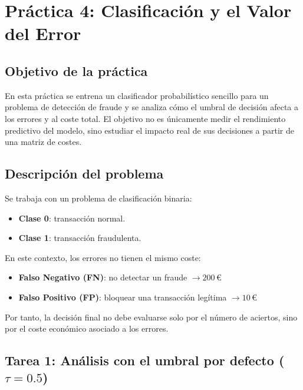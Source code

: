 
\section{Práctica 4: Clasificación y el Valor del Error}

\subsection{Objetivo de la práctica}
En esta práctica se entrena un clasificador probabilístico sencillo para un problema de detección de fraude y se analiza cómo el umbral de decisión afecta a los errores y al coste total. El objetivo no es únicamente medir el rendimiento predictivo del modelo, sino estudiar el impacto real de sus decisiones a partir de una matriz de costes.

\subsection{Descripción del problema}
Se trabaja con un problema de clasificación binaria:
\begin{itemize}
    \item \textbf{Clase 0}: transacción normal.
    \item \textbf{Clase 1}: transacción fraudulenta.
\end{itemize}

En este contexto, los errores no tienen el mismo coste:
\begin{itemize}
    \item \textbf{Falso Negativo (FN)}: no detectar un fraude \(\rightarrow 200\,€\)
    \item \textbf{Falso Positivo (FP)}: bloquear una transacción legítima \(\rightarrow 10\,€\)
\end{itemize}

Por tanto, la decisión final no debe evaluarse solo por el número de aciertos, sino por el coste económico asociado a los errores.

\subsection{Tarea 1: Análisis con el umbral por defecto (\(\tau = 0.5\))}

